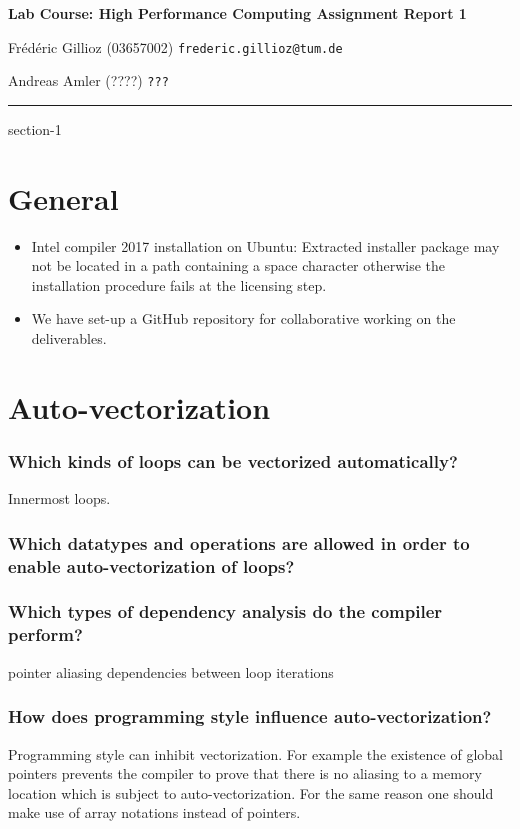\documentclass[11pt]{article}
\makeatletter
\newcommand{\hwhead}[4]{
\begin{center}
\sffamily\large\bfseries Lab Course: High Performance Computing Assignment Report #1
\vspace{2mm} 
\normalfont

#2

#3
\end{center}
\vspace{6mm} \hrule \vspace{4mm}
}
\newcommand{\namea}{Frédéric Gillioz (03657002) \texttt{frederic.gillioz@tum.de}}
\newcommand{\nameb}{Andreas Amler (????) \texttt{???}}
\makeatother
\begin{document}
\hwhead{1}{\namea}{\nameb}


\setcounter{section}{-1}
\section{General}

\begin{itemize}
\item Intel compiler 2017 installation on Ubuntu: Extracted installer package may not be located in a path containing a space character otherwise the installation procedure fails at the licensing step.
\item We have set-up a GitHub repository for collaborative working on the deliverables.
\end{itemize}

\section{Auto-vectorization}

\subsubsection*{Which kinds of loops can be vectorized automatically?}
Innermost loops.

\subsubsection*{Which datatypes and operations are allowed in order to enable auto-vectorization of loops?}

\subsubsection*{Which types of dependency analysis do the compiler perform?}

pointer aliasing
dependencies between loop iterations

\subsubsection*{How does programming style influence auto-vectorization?}
Programming style can inhibit vectorization. For example the existence of global pointers prevents the compiler to prove that there is no aliasing to a memory location which is subject to auto-vectorization. For the same reason one should make use of array notations instead of pointers.
\end{document}
